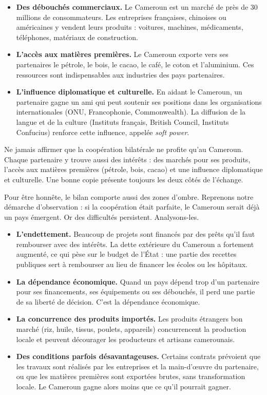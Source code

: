 \documentclass[11pt]{article}
\newcommand{\cle}[1]{{\popxbold\color{popdark}#1}}
\newcounter{popsec}
\newcounter{popsub}
\newcommand{\courssub}[1]{%
  \stepcounter{popsub}%
  \par\vspace{9pt}\noindent{\popxbold\fontsize{11.5}{13}\selectfont\color{popink}{\color{poporange}\thepopsec.\thepopsub}\hspace{6pt}#1}\par\nopagebreak\vspace{4pt}
}
\begin{document}
\begin{itemize}
\item \textbf{Des débouchés commerciaux.} Le Cameroun est un marché de près de 30 millions de consommateurs. Les entreprises françaises, chinoises ou américaines y vendent leurs produits : voitures, machines, médicaments, téléphones, matériaux de construction.
\item \textbf{L'accès aux matières premières.} Le Cameroun exporte vers ses partenaires le \cle{pétrole}, le \cle{bois}, le \cle{cacao}, le café, le coton et l'aluminium. Ces ressources sont indispensables aux industries des pays partenaires.
\item \textbf{L'influence diplomatique et culturelle.} En aidant le Cameroun, un partenaire gagne un ami qui peut soutenir ses positions dans les organisations internationales (ONU, Francophonie, Commonwealth). La diffusion de la langue et de la culture (Instituts français, British Council, Instituts Confucius) renforce cette influence, appelée \emph{soft power}.
\end{itemize}

\begin{attention}
Ne jamais affirmer que la coopération bilatérale ne profite qu'au Cameroun. Chaque partenaire y trouve aussi des intérêts : des marchés pour ses produits, l'accès aux matières premières (pétrole, bois, cacao) et une influence diplomatique et culturelle. Une bonne copie présente toujours les deux côtés de l'échange.
\end{attention}

\courssub{Les limites de la coopération bilatérale}

Pour être honnête, le bilan comporte aussi des zones d'ombre. Reprenons notre démarche d'observation : si la coopération était parfaite, le Cameroun serait déjà un pays émergent. Or des difficultés persistent. Analysons-les.

\begin{itemize}
\item \textbf{L'endettement.} Beaucoup de projets sont financés par des \cle{prêts} qu'il faut rembourser avec des intérêts. La dette extérieure du Cameroun a fortement augmenté, ce qui pèse sur le budget de l'État : une partie des recettes publiques sert à rembourser au lieu de financer les écoles ou les hôpitaux.
\item \textbf{La dépendance économique.} Quand un pays dépend trop d'un partenaire pour ses financements, ses équipements ou ses débouchés, il perd une partie de sa liberté de décision. C'est la \cle{dépendance économique}.
\item \textbf{La concurrence des produits importés.} Les produits étrangers bon marché (riz, huile, tissus, poulets, appareils) concurrencent la production locale et peuvent décourager les producteurs et artisans camerounais.
\item \textbf{Des conditions parfois désavantageuses.} Certains contrats prévoient que les travaux sont réalisés par les entreprises et la main-d'œuvre du partenaire, ou que les matières premières sont exportées brutes, sans transformation locale. Le Cameroun gagne alors moins que ce qu'il pourrait gagner.
\end{itemize}
\end{document}

